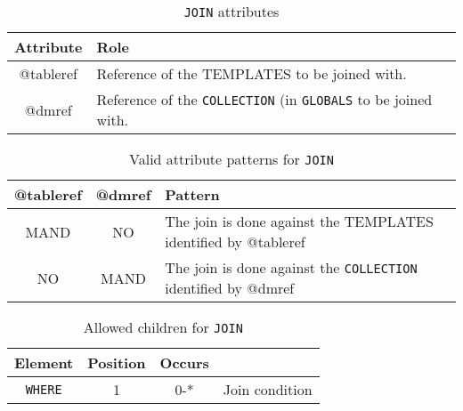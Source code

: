 \begin{lstlisting}[frame=single,caption={\texttt{JOIN} },style=XML,basicstyle=\tiny]

\end{lstlisting}


\begin{table}[!htbp]
\small
\centering
\begin{tabulary}{\linewidth}{|c|J|}       
       \hline 
            \textbf{Attribute} & 
            \textbf {Role}\\
       \hline         \hline  
             @tableref& 
            Reference of the TEMPLATES to be joined with. \\
        \hline 
            @dmref & 
            Reference of the \texttt{COLLECTION} (in \texttt{GLOBALS} to be joined with. \\
        \hline 
     \end{tabulary}
     \caption{\texttt{JOIN} attributes} 
     \label{tbl:join-att}
 \end{table}

\begin{table}[!htbp]
\small
\centering
\begin{tabulary}{\linewidth}{|c|c|J|}
    \hline 
        \textbf{@tableref} &
        \textbf{@dmref} &
        \textbf{Pattern}\\
    \hline      \hline  
        MAND &           
        NO &           
        The join is done against the TEMPLATES identified by @tableref \\  
    \hline   
        NO &           
        MAND &           
        The join is done against the \texttt{COLLECTION} identified by @dmref \\
   \hline 
\end{tabulary}
     \caption{Valid attribute patterns for  \texttt{JOIN}}
     \label{tbl:join-pattern}
\end{table}


\begin{table}[!htbp]
\small
\centering
\begin{tabulary}{\linewidth}{|c |c |c|J|}
    \hline 
        \textbf{Element} &
        \textbf{Position} &
        \textbf{Occurs} &
        \\
    \hline      \hline  
        \texttt{WHERE}  &        
        1 &           
        0-* &
         Join condition\\
    \hline 
\end{tabulary}
     \caption{Allowed children for \texttt{JOIN}} 
     \label{tbl:join-chidlren}
 \end{table}
